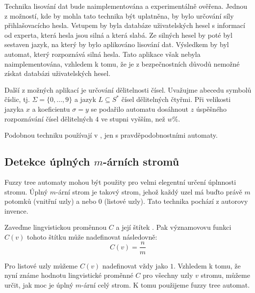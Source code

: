 \documentclass[a4paper,10pt]{article}
\begin{document}
Technika lisování dat bude naimplementována a experimentálně ověřena.  Jednou z možností, kde by mohla tato technika být uplatněna, by bylo určování síly přihlašovacícho hesla. Vstupem by byla databáze uživatelských hesel s informací od experta, která hesla jsou silná a která slabá. Ze silných hesel by poté byl sestaven jazyk, na který by bylo aplikováno lisování dat. Výsledkem by byl automat, který rozpoznává silná hesla. Tato aplikace však nebyla naimplementována, vzhledem k tomu, že je z bezpečnostních důvodů nemožné získat databázi uživatelských hesel.

Další z možných aplikací je určování dělitelnosti čísel. Uvažujme abecedu symbolů číslic, tj. $\Sigma = \{ 0, \dots, 9 \}$ a jazyk $L \subseteq S^*$ čísel dělitelných čtyřmi. Při velikosti jazyka $x$ a koeficientu $\sigma = y$ se podařilo automatu dosáhnout $z$ úspěšného rozpoznávání čísel dělitelných $4$ ve stupni vyšším, než $w\%$. 

Podobnou techniku používají v \cite{Hac+-ProAnaLarFinStaMac}, jen s pravděpodobnostními automaty.


\subsection{Detekce úplných $m$-árních stromů} \label{subs:DetComTrees}
Fuzzy tree automaty mohou být použity pro velmi elegentní určení úplnnosti stromu. Úplný $m$-ární strom je takový strom, jehož každý uzel má buďto právě $m$ potomků (vnitřní uzly) a nebo $0$ (listové uzly). Tato technika pochází z autorovy invence.

Zaveďme lingvistickou proměnnou $C$  a její štítek . Pak významovovu funkci $C(v)$  tohoto štítku může nadefinovat následovně:
$$
  C(v) = \frac{n}{m}
$$

Pro listové uzly můžeme $C(v)$ nadefinovat vždy jako $1$. Vzhledem k tomu, že nyní známe hodnotu lingvistické proměnné $C$ pro všechny uzly $v$ stromu, můžeme určit, jak moc je úplný $m$-ární celý strom. K tomu použijeme fuzzy tree automat.
% 
% 
\end{document}
